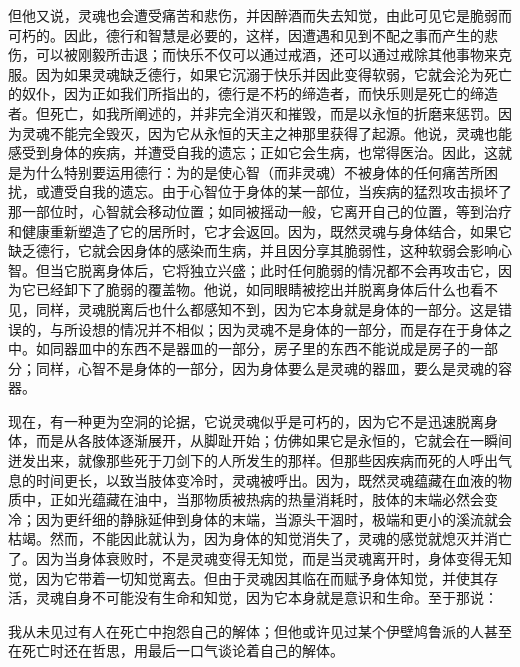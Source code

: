 但他又说，灵魂也会遭受痛苦和悲伤，并因醉酒而失去知觉，由此可见它是脆弱而可朽的。因此，德行和智慧是必要的，这样，因遭遇和见到不配之事而产生的悲伤，可以被刚毅所击退；而快乐不仅可以通过戒酒，还可以通过戒除其他事物来克服。因为如果灵魂缺乏德行，如果它沉溺于快乐并因此变得软弱，它就会沦为死亡的奴仆，因为正如我们所指出的，德行是不朽的缔造者，而快乐则是死亡的缔造者。但死亡，如我所阐述的，并非完全消灭和摧毁，而是以永恒的折磨来惩罚。因为灵魂不能完全毁灭，因为它从永恒的天主之神那里获得了起源。他说，灵魂也能感受到身体的疾病，并遭受自我的遗忘；正如它会生病，也常得医治。因此，这就是为什么特别要运用德行：为的是使心智（而非灵魂）不被身体的任何痛苦所困扰，或遭受自我的遗忘。由于心智位于身体的某一部位，当疾病的猛烈攻击损坏了那一部位时，心智就会移动位置；如同被摇动一般，它离开自己的位置，等到治疗和健康重新塑造了它的居所时，它才会返回。因为，既然灵魂与身体结合，如果它缺乏德行，它就会因身体的感染而生病，并且因分享其脆弱性，这种软弱会影响心智。但当它脱离身体后，它将独立兴盛；此时任何脆弱的情况都不会再攻击它，因为它已经卸下了脆弱的覆盖物。他说，如同眼睛被挖出并脱离身体后什么也看不见，同样，灵魂脱离后也什么都感知不到，因为它本身就是身体的一部分。这是错误的，与所设想的情况并不相似；因为灵魂不是身体的一部分，而是存在于身体之中。如同器皿中的东西不是器皿的一部分，房子里的东西不能说成是房子的一部分；同样，心智不是身体的一部分，因为身体要么是灵魂的器皿，要么是灵魂的容器。\par

现在，有一种更为空洞的论据，它说灵魂似乎是可朽的，因为它不是迅速脱离身体，而是从各肢体逐渐展开，从脚趾开始；仿佛如果它是永恒的，它就会在一瞬间迸发出来，就像那些死于刀剑下的人所发生的那样。但那些因疾病而死的人呼出气息的时间更长，以致当肢体变冷时，灵魂被呼出。因为，既然灵魂蕴藏在血液的物质中，正如光蕴藏在油中，当那物质被热病的热量消耗时，肢体的末端必然会变冷；因为更纤细的静脉延伸到身体的末端，当源头干涸时，极端和更小的溪流就会枯竭。然而，不能因此就认为，因为身体的知觉消失了，灵魂的感觉就熄灭并消亡了。因为当身体衰败时，不是灵魂变得无知觉，而是当灵魂离开时，身体变得无知觉，因为它带着一切知觉离去。但由于灵魂因其临在而赋予身体知觉，并使其存活，灵魂自身不可能没有生命和知觉，因为它本身就是意识和生命。至于那说：\par

\par

我从未见过有人在死亡中抱怨自己的解体；但他或许见过某个伊壁鸠鲁派的人甚至在死亡时还在哲思，用最后一口气谈论着自己的解体。\par

